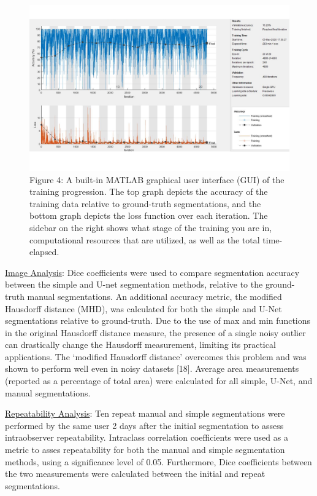 \documentclass[conference]{IEEEtran}
\begin{document}
\begin{figure}[h]
\centering
\includegraphics[scale=0.25]{Slide4.PNG}
\caption{Figure 4: A built-in MATLAB graphical user interface (GUI) of the training progression. The top graph depicts the accuracy of the training data relative to ground-truth segmentations, and the bottom graph depicts the loss function over each iteration. The sidebar on the right shows what stage of the training you are in, computational resources that are utilized, as well as the total time-elapsed.}
\label{figName4}
\end{figure}

\ul{Image Analysis}: Dice coefficients were used to compare segmentation accuracy between the simple and U-net segmentation methods, relative to the ground-truth manual segmentations. An additional accuracy metric, the modified Hausdorff distance (MHD), was calculated for both the simple and U-Net segmentations relative to ground-truth. Due to the use of max and min functions in the original Hausdorff distance measure, the presence of a single noisy outlier can drastically change the Hausdorff measurement, limiting its practical applications. The ‘modified Hausdorff distance’ overcomes this problem and was shown to perform well even in noisy datasets [18]. Average area measurements (reported as a percentage of total area) were calculated for all simple, U-Net, and manual segmentations. 

\ul{Repeatability Analysis}: Ten repeat manual and simple segmentations were performed by the same user 2 days after the initial segmentation to assess intraobserver repeatability. Intraclass correlation coefficients were used as a metric to asses repeatability for both the manual and simple segmentation methods, using a significance level of 0.05. Furthermore, Dice coefficients between the two measurements were calculated between the initial and repeat segmentations. 
\end{document}
